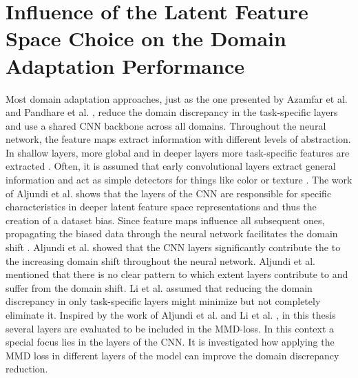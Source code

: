 \section{Influence of the Latent Feature Space Choice on the Domain Adaptation Performance}
Most domain adaptation approaches, just as the one presented by Azamfar et al. \cite{AZAMFAR2020103932} and Pandhare et al. \cite{Pandhare2021}, reduce the domain discrepancy in the task-specific layers and use a shared CNN backbone across all domains. Throughout the neural network, the feature maps extract information with different levels of abstraction. In shallow layers, more global and in deeper layers more task-specific features are extracted \cite{Aljundi2016}. Often, it is assumed that early convolutional layers extract general information and act as simple detectors for things like color or texture \cite{Aljundi2016}. The work of Aljundi et al. \cite{Aljundi2016} shows that the layers of the CNN are responsible for specific characteristics in deeper latent feature space representations and thus the creation of a dataset bias. Since feature maps influence all subsequent ones, propagating the biased data through the neural network facilitates the domain shift \cite{Aljundi2016}. Aljundi et al. \cite{Aljundi2016} showed that the CNN layers significantly contribute the to the increasing domain shift throughout the neural network. Aljundi et al. \cite{Aljundi2016} mentioned that there is no clear pattern to which extent layers contribute to and suffer from the domain shift. Li et al. \cite{li2020} assumed that reducing the domain discrepancy in only task-specific layers might minimize but not completely eliminate it. Inspired by the work of Aljundi et al. \cite{Aljundi2016} and Li et al. \cite{li2020}, in this thesis several layers are evaluated to be included in the MMD-loss. In this context a special focus lies in the layers of the CNN. It is investigated how applying the MMD loss in different layers of the model can improve the domain discrepancy reduction.


